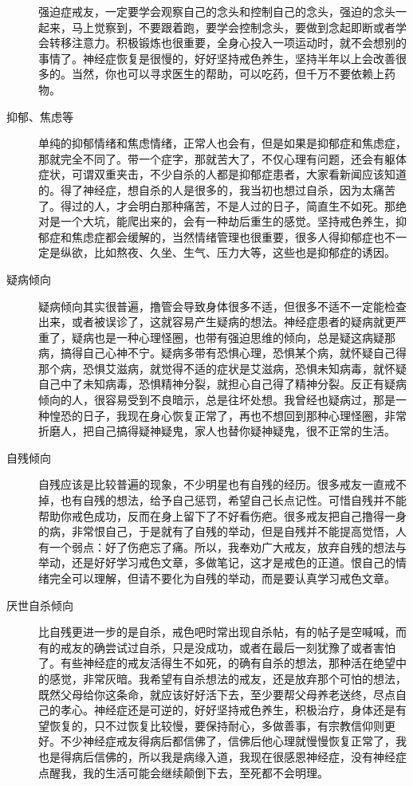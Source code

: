\begin{description}
    强迫症戒友，一定要学会观察自己的念头和控制自己的念头，强迫的念头一起来，马上觉察到，不要跟着跑，要学会控制念头，要做到念起即断或者学会转移注意力。积极锻炼也很重要，全身心投入一项运动时，就不会想别的事情了。神经症恢复是很慢的，好好坚持戒色养生，坚持半年以上会改善很多的。当然，你也可以寻求医生的帮助，可以吃药，但千万不要依赖上药物。
    \item[抑郁、焦虑等] 单纯的抑郁情绪和焦虑情绪，正常人也会有，但是如果是抑郁症和焦虑症，那就完全不同了。带一个症字，那就苦大了，不仅心理有问题，还会有躯体症状，可谓双重夹击，不少自杀的人都是抑郁症患者，大家看新闻应该知道的。得了神经症，想自杀的人是很多的，我当初也想过自杀，因为太痛苦了。得过的人，才会明白那种痛苦，不是人过的日子，简直生不如死。那绝对是一个大坑，能爬出来的，会有一种劫后重生的感觉。坚持戒色养生，抑郁症和焦虑症都会缓解的，当然情绪管理也很重要，很多人得抑郁症也不一定是纵欲，比如熬夜、久坐、生气、压力大等，这些也是抑郁症的诱因。
    \item[疑病倾向] 疑病倾向其实很普遍，撸管会导致身体很多不适，但很多不适不一定能检查出来，或者被误诊了，这就容易产生疑病的想法。神经症患者的疑病就更严重了，疑病也是一种心理怪圈，也带有强迫思维的倾向，总是疑这病疑那病，搞得自己心神不宁。疑病多带有恐惧心理，恐惧某个病，就怀疑自己得那个病，恐惧艾滋病，就觉得不适的症状是艾滋病，恐惧未知病毒，就怀疑自己中了未知病毒，恐惧精神分裂，就担心自己得了精神分裂。反正有疑病倾向的人，很容易受到不良暗示，总是往坏处想。我曾经也疑病过，那是一种惶恐的日子，我现在身心恢复正常了，再也不想回到那种心理怪圈，非常折磨人，把自己搞得疑神疑鬼，家人也替你疑神疑鬼，很不正常的生活。
    \item[自残倾向] 自残应该是比较普遍的现象，不少明星也有自残的经历。很多戒友一直戒不掉，也有自残的想法，给予自己惩罚，希望自己长点记性。可惜自残并不能帮助你戒色成功，反而在身上留下了不好看伤疤。很多戒友把自己撸得一身的病，非常恨自己，于是就有了自残的举动，但是自残并不能提高觉悟，人有一个弱点：好了伤疤忘了痛。所以，我奉劝广大戒友，放弃自残的想法与举动，还是好好学习戒色文章，多做笔记，这才是戒色的正道。恨自己的情绪完全可以理解，但请不要化为自残的举动，而是要认真学习戒色文章。
    \item[厌世自杀倾向] 比自残更进一步的是自杀，戒色吧时常出现自杀帖，有的帖子是空喊喊，而有的戒友的确尝试过自杀，只是没成功，或者在最后一刻犹豫了或者害怕了。有些神经症的戒友活得生不如死，的确有自杀的想法，那种活在绝望中的感觉，非常灰暗。我希望有自杀想法的戒友，还是放弃那个可怕的想法，既然父母给你这条命，就应该好好活下去，至少要帮父母养老送终，尽点自己的孝心。神经症还是可逆的，好好坚持戒色养生，积极治疗，身体还是有望恢复的，只不过恢复比较慢，要保持耐心，多做善事，有宗教信仰则更好。不少神经症戒友得病后都信佛了，信佛后他心理就慢慢恢复正常了，我也是得病后信佛的，所以我是病缘入道，我现在很感恩神经症，没有神经症点醒我，我的生活可能会继续颠倒下去，至死都不会明理。

\end{description}
